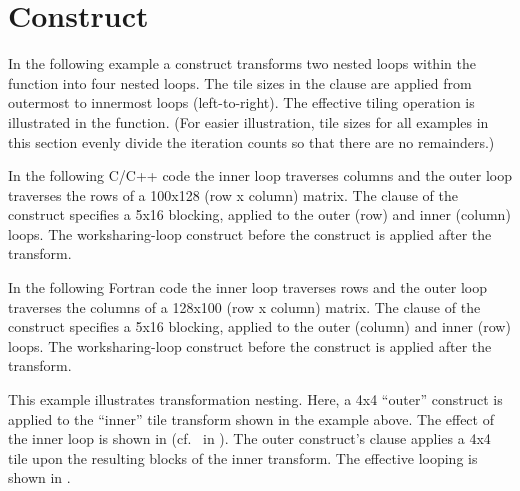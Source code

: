 \section{ Construct}
\label{sec:tile}

In the following example a  construct transforms two nested loops
within the  function into four nested loops.
The tile sizes in the  clause are applied from outermost
to innermost loops (left-to-right). The effective tiling operation is illustrated in
the  function. 
(For easier illustration, tile sizes for all examples in this section evenly 
divide the iteration counts so that there are no remainders.)

In the following C/C++ code the inner loop traverses columns
and the outer loop traverses the rows of a 100x128 (row x column) matrix.  
The  clause of the  construct specifies
a 5x16 blocking, applied to the outer (row) and inner (column) loops.
The worksharing-loop construct before the 
construct is applied after the transform.


In the following Fortran code the inner loop traverses rows 
and the outer loop traverses the columns of a 128x100 (row x column) matrix.  
The   clause of the  construct specifies 
a 5x16 blocking, applied to the outer (column) and inner (row) loops.
The worksharing-loop construct before the 
construct is applied after the transform.

\clearpage

This example illustrates transformation nesting.
Here, a 4x4 ``outer''   construct is applied to the ``inner'' tile transform shown in the example above.
The effect of the inner loop is shown in  (cf.\  in ).
The outer  construct's  clause applies a 4x4 tile upon the resulting
blocks of the inner transform. The effective looping is shown in .

